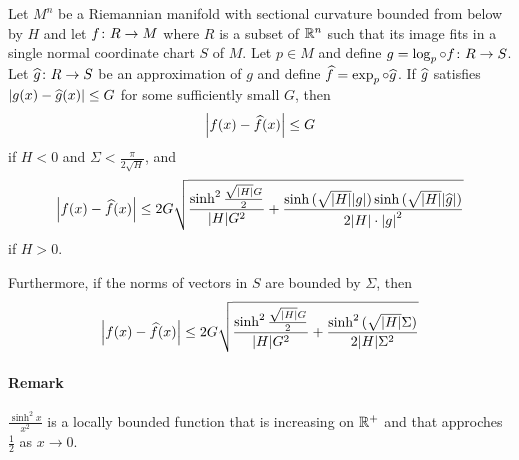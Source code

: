 \documentclass[english, a4paper, 12pt]{article}
\begin{document}
\begin{theorem}
	Let $M^n$ be a Riemannian manifold with sectional curvature bounded from below by $H$ and let $f \colon R \to M$ where $R$ is a subset of $\mathbb{R}^n$ such that its image fits in a single normal coordinate chart $S$ of $M$.
	Let $p \in M$ and define $g = \operatorname{log}_p \circ f \colon R \to S$.
	Let $\widehat{g} \colon R \to S$ be an approximation of $g$ and define $\widehat{f} = \operatorname{exp}_p \circ \widehat{g}$.
	If $\widehat{g}$ satisfies $\abs{g(x) - \widehat{g}(x)} \leq G$ for some sufficiently small $G$, then
	\begin{align}
		\abs{f(x) - \widehat{f}(x)} \leq G
	\end{align}
	if $H < 0$ and $\Sigma < \frac{\pi}{2 \sqrt{H}}$, and
	\begin{align}
		\abs{f(x) - \widehat{f}(x)} \leq 2 G \sqrt{
			\frac{\sinh^2{\frac{\sqrt{\abs{H}} G}{2}}}{\abs{H} G^2}
			+ \frac{\sinh{(\sqrt{\abs{H}} \abs{g})} \sinh{(\sqrt{\abs{H}} \abs{\widehat{g}})}}{2 \abs{H} \cdot \abs{g}^2}
			}
	\end{align}
	if $H > 0$.

	Furthermore, if the norms of vectors in $S$ are bounded by $\Sigma$, then
	\begin{align}
		\abs{f(x) - \widehat{f}(x)} \leq 2 G \sqrt{
			\frac{\sinh^2{\frac{\sqrt{\abs{H}} G}{2}}}{\abs{H} G^2}
			+ \frac{\sinh^2{(\sqrt{\abs{H}} \Sigma)}}{2 \abs{H} \Sigma^2}
			}
	\end{align}
\end{theorem}

\paragraph{Remark} 
$\frac{\sinh^2{x}}{x^2}$ is a locally bounded function that is increasing on $\mathbb{R}^+$ and that approches $\frac{1}{2}$ as $x \to 0$.
\end{document}
